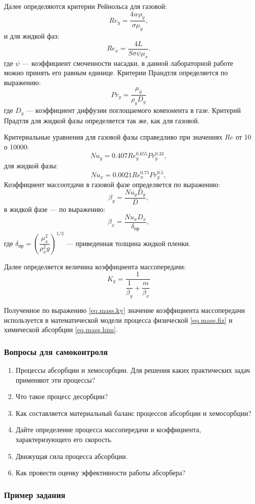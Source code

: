 Далее определяются критерии Рейнольса для газовой:
\begin{equation}
	Re_y = \dfrac{4 w \rho_y}{\sigma \mu_y},
\end{equation}
и для жидкой фаз:
\begin{equation}
	Re_x = \dfrac{4 L}{S \sigma \psi \mu_x}.
\end{equation}
где $\psi$ --- коэффициент смоченности насадки, в данной лабораторной работе можно принять его равным единице.
Критерии Прандтля определяется по выражению:
\begin{equation}
	Pr_y = \dfrac{\mu_y}{\rho_y D_y}
\end{equation}
где $D_y$ --- коэффициент диффузии поглощаемого компонента в газе. Критерий Прадтля для жидкой фазы определяется так же, как для газовой.

Критериальные уравнения для газовой фазы справедливо при значениях $Re$ от 10 о 10000:
\begin{equation}
	Nu_y = 0.407 Re_y^{0.655} Pr_y^{0.33},
\end{equation}
для жидкой фазы:
\begin{equation}
Nu_x = 0.0021 Re_x^{0.75} Pr_y^{0.5},
\end{equation}
Коэффициент массоотдачи в газовой фазе определяется по выражению:
\begin{equation}
	\beta_y = \dfrac{Nu_y D_y} {D},
\end{equation}
в жидкой фазе --- по выражению:
\begin{equation}
\beta_x = \dfrac{Nu_x D_x}{\delta_{пр}},
\end{equation}
где $\delta_{пр} = \left( \dfrac{\mu_x^2} {\rho_x^2 g} \right)^{1/3} $ --- приведенная толщина жидкой пленки.

Далее определяется величина коэффициента массопередачи:
\begin{equation} \label{eq.mass.ky}
 K_y = \dfrac{1}{\dfrac{1}{\beta_y} + \dfrac{m}{\beta_x}}
\end{equation}

Полученное по выражению \eqref{eq.mass.ky} значение коэффициента массопередачи используется в математической модели процесса физической \eqref{eq.mass.fiz} и химической абсорбции \eqref{eq.mass.him}.

\subsubsection*{Вопросы для самоконтроля}
\begin{enumerate}
	\item Процессы абсорбции и хемосорбции. Для решения каких практических задач применяют эти процессы?
	\item Что такое процесс десорбции?
	\item Как составляется материальный баланс процессов абсорбции и хемосорбции?
	\item Дайте определение процесса массопередачи и коэффициента, характеризующего его скорость.
	\item Движущая сила процесса абсорбции.
	\item Как провести оценку эффективности работы абсорбера?
\end{enumerate}

\subsubsection*{Пример задания}
